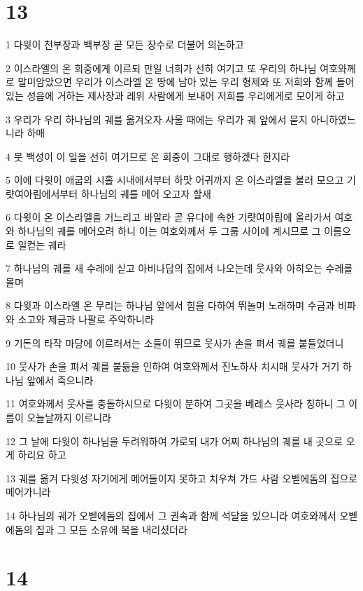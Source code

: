 \chapter{13}

\par 1 다윗이 천부장과 백부장 곧 모든 장수로 더불어 의논하고
\par 2 이스라엘의 온 회중에게 이르되 만일 너희가 선히 여기고 또 우리의 하나님 여호와께로 말미암았으면 우리가 이스라엘 온 땅에 남아 있는 우리 형제와 또 저희와 함께 들어 있는 성읍에 거하는 제사장과 레위 사람에게 보내어 저희를 우리에게로 모이게 하고
\par 3 우리가 우리 하나님의 궤를 옮겨오자 사울 때에는 우리가 궤 앞에서 묻지 아니하였느니라 하매
\par 4 뭇 백성이 이 일을 선히 여기므로 온 회중이 그대로 행하겠다 한지라
\par 5 이에 다윗이 애굽의 시홀 시내에서부터 하맛 어귀까지 온 이스라엘을 불러 모으고 기럇여아림에서부터 하나님의 궤를 메어 오고자 할새
\par 6 다윗이 온 이스라엘을 거느리고 바알라 곧 유다에 속한 기럇여아림에 올라가서 여호와 하나님의 궤를 메어오려 하니 이는 여호와께서 두 그룹 사이에 계시므로 그 이름으로 일컫는 궤라
\par 7 하나님의 궤를 새 수레에 싣고 아비나답의 집에서 나오는데 웃사와 아히오는 수레를 몰며
\par 8 다윗과 이스라엘 온 무리는 하나님 앞에서 힘을 다하여 뛰놀며 노래하며 수금과 비파와 소고와 제금과 나팔로 주악하니라
\par 9 기돈의 타작 마당에 이르러서는 소들이 뛰므로 웃사가 손을 펴서 궤를 붙들었더니
\par 10 웃사가 손을 펴서 궤를 붙듦을 인하여 여호와께서 진노하사 치시매 웃사가 거기 하나님 앞에서 죽으니라
\par 11 여호와께서 웃사를 충돌하시므로 다윗이 분하여 그곳을 베레스 웃사라 칭하니 그 이름이 오늘날까지 이르니라
\par 12 그 날에 다윗이 하나님을 두려워하여 가로되 내가 어찌 하나님의 궤를 내 곳으로 오게 하리요 하고
\par 13 궤를 옮겨 다윗성 자기에게 메어들이지 못하고 치우쳐 가드 사람 오벧에돔의 집으로 메어가니라
\par 14 하나님의 궤가 오벧에돔의 집에서 그 권속과 함께 석달을 있으니라 여호와께서 오벧에돔의 집과 그 모든 소유에 복을 내리셨더라

\chapter{14}

